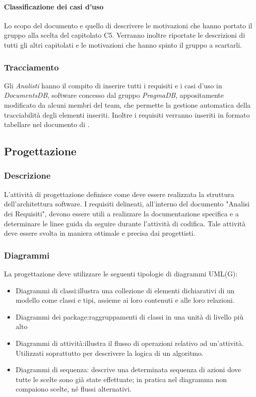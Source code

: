 \paragraph{Classificazione dei casi d'uso}
Lo scopo del documento e quello di descrivere le motivazioni che hanno portato il gruppo alla scelta del capitolato C5.
Verranno inoltre riportate le descrizioni di tutti gli altri capitolati e le motivazioni che hanno spinto il gruppo a scartarli.

\subsubsection{Tracciamento}
Gli \textsl{Analisti} hanno il compito di inserire tutti i requisiti e i casi d'uso in \textsl{DocumentsDB},
software concesso dal gruppo \textsl{PragmaDB}, appositamente modificato da alcuni membri del 
team, che permette la gestione automatica della tracciabilità degli elementi inseriti. 
Inoltre i requisiti verranno inseriti in formato tabellare nel documento di \textsl{\AdR}.
\subsection{Progettazione}


\subsubsection{Descrizione}
L'attività di progettazione definisce come deve essere realizzata la struttura dell'architettura software. I requisiti delineati, all'interno del documento "Analisi dei Requisiti", devono essere utili a realizzare la documentazione specifica e a determinare le linee guida da seguire durante l'attività di codifica. 
Tale attività deve essere svolta in maniera ottimale e precisa dai progettisti.  
  
\subsubsection{Diagrammi}
La progettazione deve utilizzare le seguenti tipologie di diagrammi UML(G):
\begin{itemize} 
\item
Diagrammi di classi:illustra una collezione di elementi dichiarativi di un modello come classi e tipi, assieme ai loro contenuti e alle loro relazioni.  
\item
Diagrammi dei package:raggruppamenti di classi in una unità di livello più alto
\item
Diagrammi di attività:illustra il flusso di operazioni relativo ad un'attività. Utilizzati soprattutto per descrivere la logica di un algoritmo.  
\item
Diagrammi di sequenza: descrive una determinata sequenza di azioni dove tutte le scelte sono già state effettuate; in pratica nel diagramma non compaiono scelte, né flussi alternativi.
\end{itemize}


